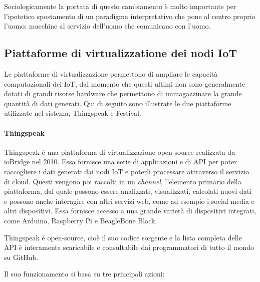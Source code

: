 Sociologicamente la portata di questo cambiamento è molto importante per l'ipotetico spostamento di un paradigma interpretativo che pone al centro proprio l'uomo: macchine al servizio dell'uomo che comunicano con l'uomo.


\subsection{Piattaforme di virtualizzatione dei nodi IoT}
\label{c:tec:virt}

Le piattaforme di virtualizzazione permettono di ampliare le capacità computazionali dei IoT, dal momento che questi ultimi non sono generalmente dotati di grandi risorse hardware che permettono di immagazzinare la grande quantità di dati generati. Qui di seguito sono illustrate le due piattaforme utilizzate nel sistema, Thingspeak e Festival.

\paragraph{Thingspeak}
\label{c:tec:virt:ts}

Thingspeak è una piattaforma di virtualizzazione open-source realizzata da ioBridge nel 2010. Essa fornisce una serie di applicazioni e di API per poter raccogliere i dati generati dai nodi IoT e poterli processare attraverso il servizio di cloud. Questi vengono poi raccolti in un \textit{channel}, l'elemento primario della piattaforma, dal quale possono essere analizzati, visualizzati, calcolati nuovi dati e possono anche interagire con altri servizi web, come ad esempio i social media e altri dispositivi. Essa fornisce accesso a una grande varietà di dispositivi integrati, come Arduino, Raspberry Pi e BeagleBone Black. 

Thingspeak è open-source, cioè il suo codice sorgente e la lista completa delle API è interamente scaricabile e consultabile dai programmatori di tutto il mondo su GitHub.

Il suo funzionamento si basa su tre principali azioni:

